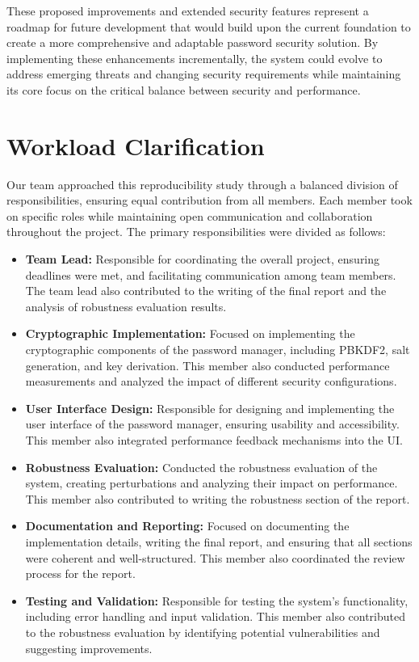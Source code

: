 \documentclass[11pt,a4paper]{article}
\begin{document}
These proposed improvements and extended security features represent a roadmap for future development that would build upon the current foundation to create a more comprehensive and adaptable password security solution. By implementing these enhancements incrementally, the system could evolve to address emerging threats and changing security requirements while maintaining its core focus on the critical balance between security and performance.
\section{Workload Clarification}

Our team approached this reproducibility study through a balanced division of responsibilities, ensuring equal contribution from all members. Each member took on specific roles while maintaining open communication and collaboration throughout the project.
The primary responsibilities were divided as follows:
\begin{itemize}
    \item \textbf{Team Lead:} Responsible for coordinating the overall project, ensuring deadlines were met, and facilitating communication among team members. The team lead also contributed to the writing of the final report and the analysis of robustness evaluation results.
    \item \textbf{Cryptographic Implementation:} Focused on implementing the cryptographic components of the password manager, including PBKDF2, salt generation, and key derivation. This member also conducted performance measurements and analyzed the impact of different security configurations.
    \item \textbf{User Interface Design:} Responsible for designing and implementing the user interface of the password manager, ensuring usability and accessibility. This member also integrated performance feedback mechanisms into the UI.
    \item \textbf{Robustness Evaluation:} Conducted the robustness evaluation of the system, creating perturbations and analyzing their impact on performance. This member also contributed to writing the robustness section of the report.
    \item \textbf{Documentation and Reporting:} Focused on documenting the implementation details, writing the final report, and ensuring that all sections were coherent and well-structured. This member also coordinated the review process for the report.
    \item \textbf{Testing and Validation:} Responsible for testing the system's functionality, including error handling and input validation. This member also contributed to the robustness evaluation by identifying potential vulnerabilities and suggesting improvements.
\end{itemize}
\end{document}
